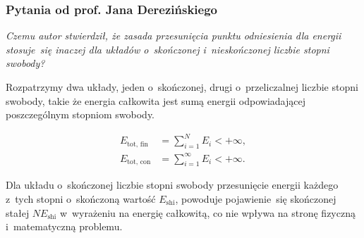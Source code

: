 \documentclass[10pt,t]{beamer}
\begin{document}
\begin{frame}
  \frametitle{Pytania od prof. Jana Derezińskiego}


  \textit{Czemu autor stwierdził, że zasada przesunięcia punktu odniesienia
    dla energii stosuje~się inaczej dla układów o~skończonej i~nieskończonej
    liczbie stopni swobody?}

  Rozpatrzymy dwa układy, jeden o~skończonej, drugi o~przeliczalnej liczbie
  stopni swobody, takie że energia całkowita jest sumą energii
  odpowiadającej poszczególnym stopniom swobody.

  \vspace{-1.8em}



  \begin{subequations}

    \begin{align}
      \label{eq:Algebraiczne-podejscie-ETC-01}
      E_{ \text{tot, fin} }
      &=
        \sum_{ i = 1 }^{ N } E_{ i } < +\infty, \\
        \label{eq:Algebraiczne-podejscie-ETC-01}
      E_{ \text{tot, con} }
      &=
        \sum_{ i = 1 }^{ \infty } E_{ i } < +\infty.
    \end{align}

  \end{subequations}

  \vspace{-1em}


  Dla układu o~skończonej liczbie stopni swobody przesunięcie energii
  każdego z~tych stopni o~skończoną wartość $E_{ \text{shi} }$, powoduje
  pojawienie~się skończonej stałej $N E_{ \text{shi} }$ w~wyrażeniu na
  energię całkowitą, co nie wpływa na stronę fizyczną
  i~matematyczną problemu. %

\end{frame}
\end{document}

